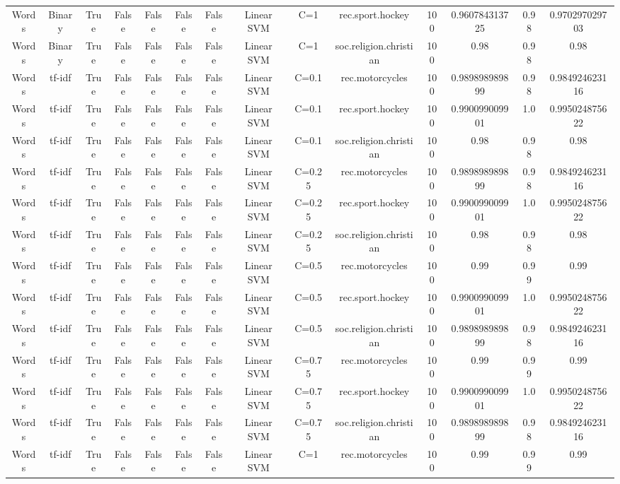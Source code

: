 \documentclass{article}
\begin{document}
\begin{tabular}{|c|c|c|c|c|c|c|c|c|c|c|c|c|c|}
Words & Binary & True & False & False & False & False & Linear SVM & C=1 & rec.sport.hockey & 100 & 0.960784313725 & 0.98 & 0.970297029703 \\ 
Words & Binary & True & False & False & False & False & Linear SVM & C=1 & soc.religion.christian & 100 & 0.98 & 0.98 & 0.98 \\ 
Words & tf-idf & True & False & False & False & False & Linear SVM & C=0.1 & rec.motorcycles & 100 & 0.989898989899 & 0.98 & 0.984924623116 \\ 
Words & tf-idf & True & False & False & False & False & Linear SVM & C=0.1 & rec.sport.hockey & 100 & 0.990099009901 & 1.0 & 0.995024875622 \\ 
Words & tf-idf & True & False & False & False & False & Linear SVM & C=0.1 & soc.religion.christian & 100 & 0.98 & 0.98 & 0.98 \\ 
Words & tf-idf & True & False & False & False & False & Linear SVM & C=0.25 & rec.motorcycles & 100 & 0.989898989899 & 0.98 & 0.984924623116 \\ 
Words & tf-idf & True & False & False & False & False & Linear SVM & C=0.25 & rec.sport.hockey & 100 & 0.990099009901 & 1.0 & 0.995024875622 \\ 
Words & tf-idf & True & False & False & False & False & Linear SVM & C=0.25 & soc.religion.christian & 100 & 0.98 & 0.98 & 0.98 \\ 
Words & tf-idf & True & False & False & False & False & Linear SVM & C=0.5 & rec.motorcycles & 100 & 0.99 & 0.99 & 0.99 \\ 
Words & tf-idf & True & False & False & False & False & Linear SVM & C=0.5 & rec.sport.hockey & 100 & 0.990099009901 & 1.0 & 0.995024875622 \\ 
Words & tf-idf & True & False & False & False & False & Linear SVM & C=0.5 & soc.religion.christian & 100 & 0.989898989899 & 0.98 & 0.984924623116 \\ 
Words & tf-idf & True & False & False & False & False & Linear SVM & C=0.75 & rec.motorcycles & 100 & 0.99 & 0.99 & 0.99 \\ 
Words & tf-idf & True & False & False & False & False & Linear SVM & C=0.75 & rec.sport.hockey & 100 & 0.990099009901 & 1.0 & 0.995024875622 \\ 
Words & tf-idf & True & False & False & False & False & Linear SVM & C=0.75 & soc.religion.christian & 100 & 0.989898989899 & 0.98 & 0.984924623116 \\ 
Words & tf-idf & True & False & False & False & False & Linear SVM & C=1 & rec.motorcycles & 100 & 0.99 & 0.99 & 0.99 \\ 

\end{tabular}
\end{document}
